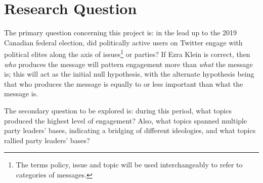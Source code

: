 \section{Research Question}

The primary question concerning this project is: in the lead up to the 2019
Canadian federal election, did politically active users on Twitter engage with
political elites along the axis of issues\footnote{The terms policy, issue and
topic will be used interchangeably to refer to categories of messages.} or
parties? If Ezra Klein is correct, then \emph{who} produces the message will
pattern engagement more than \emph{what} the message is; this will act as the
initial null hypothesis, with the alternate hypothesis being that who produces
the message is equally to or less important than what the message is. 

The secondary question to be explored is: during this period, what topics
produced the highest level of engagement? Also, what topics spanned multiple
party leaders' bases, indicating a bridging of different ideologies, and what
topics rallied party leaders' bases?